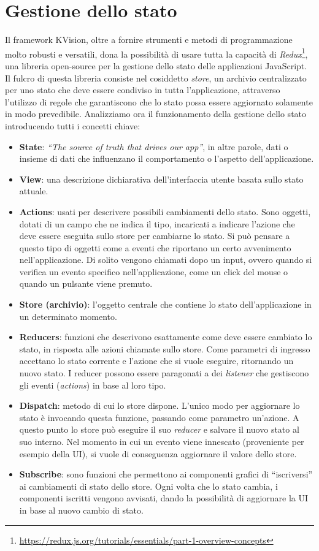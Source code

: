 \section{Gestione dello stato}\label{section:state-management}
Il framework KVision, oltre a fornire strumenti e metodi di programmazione molto robusti e versatili, dona la possibilità di usare tutta la capacità di  \textit{Redux}\footnote{\url{https://redux.js.org/tutorials/essentials/part-1-overview-concepts}}, una libreria open-source per la gestione dello stato delle applicazioni JavaScript. Il fulcro di questa libreria consiste nel cosiddetto \textit{store}, un archivio centralizzato per uno stato che deve essere condiviso in tutta l'applicazione, attraverso l'utilizzo di regole che garantiscono che lo stato possa essere aggiornato solamente in modo prevedibile. Analizziamo ora il funzionamento della gestione dello stato introducendo tutti i concetti chiave: 
\begin{itemize}	
	\item \textbf{State}: \textit{``The source of truth that drives our app''}, in altre parole, dati o insieme di dati che influenzano il comportamento o l'aspetto dell'applicazione. 	
	\item \textbf{View}: una descrizione dichiarativa dell'interfaccia utente basata sullo stato attuale.
	\item \textbf{Actions}: usati per descrivere possibili cambiamenti dello stato. Sono oggetti, dotati di un campo che ne indica il tipo, incaricati a indicare l'azione che deve essere eseguita sullo store per cambiarne lo stato. Si può pensare a questo tipo di oggetti come a eventi che riportano un certo avvenimento nell'applicazione. Di solito vengono chiamati dopo un input, ovvero quando si verifica un evento specifico nell'applicazione, come un click del mouse o quando un pulsante viene premuto.
	\item \textbf{Store (archivio)}: l'oggetto centrale che contiene lo stato dell'applicazione in un determinato momento.
	\item \textbf{Reducers}: funzioni che descrivono esattamente come deve essere cambiato lo stato, in risposta alle azioni chiamate sullo store. Come parametri di ingresso accettano lo stato corrente e l'azione che si vuole eseguire, ritornando un nuovo stato. I reducer possono essere paragonati a dei \textit{listener} che gestiscono gli eventi (\textit{actions}) in base al loro tipo.
	\item \textbf{Dispatch}: metodo di cui lo store dispone. L'unico modo per aggiornare lo stato è invocando questa funzione, passando come parametro un'azione.  A questo punto lo store può eseguire il suo \textit{reducer} e salvare il nuovo stato al suo interno. Nel momento in cui un evento viene innescato (proveniente per esempio della \ac{UI}), si vuole di conseguenza aggiornare il valore dello store.
	\item \textbf{Subscribe}: sono funzioni che permettono ai componenti grafici di ``iscriversi'' ai cambiamenti di stato dello store. Ogni volta che lo stato cambia, i componenti iscritti vengono avvisati, dando la possibilità di aggiornare la \ac{UI} in base al nuovo cambio di stato.
\end{itemize}
